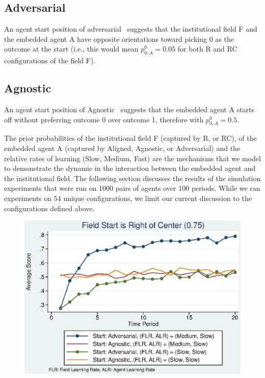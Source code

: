 \documentclass[12pt,letterpaper]{article}
\begin{document}
\subsection{Adversarial} 
An agent start position of \textquotesingle adversarial \textquotesingle \ suggests that the institutional field F and the embedded agent A have opposite orientations toward picking 0 as the outcome at the start (i.e., this would mean $p_{0,A}^0 = 0.05$ for both R and RC configurations of the field F). 

\subsection{Agnostic} 
An agent start position of \textquotesingle Agnostic  \textquotesingle \ suggests that the embedded agent A starts off without preferring outcome 0 over outcome 1, therefore with $p_{0,A}^0 = 0.5$.

The prior probabilities of the institutional field F (captured by R, or RC), of the embedded agent A (captured by Aligned, Agnostic, or Adversarial) and the relative rates of learning (Slow, Medium, Fast) are the mechanisms that we model to demonstrate the dynamic in the interaction between the embedded agent and the institutional field. The following section discusses the results of the simulation experiments that were run on 1000 pairs of agents over 100 periods. While we ran experiments on 54 unique configurations, we limit our current discussion to the configurations defined above.

\begin{figure}[h]
\begin{centering}
  \caption{}
  \includegraphics[width=\textwidth]{frcmedium3a}
  \label{fig:3a}
\end{centering}
\end{figure}
\end{document}
